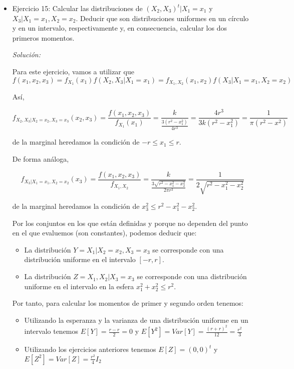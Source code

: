 \documentclass{article}
\theoremstyle{theorem-style}  %
\theoremstyle{definition}
\theoremstyle{example-style}
\begin{document}
\begin{itemize}
		\item Ejercicio 15:  Calcular las distribuciones de $(X_2, X_3)^t|X_1=x_1$ y $X_3|X_1=x_1, X_2=x_2$. Deducir que son distribuciones uniformes en un círculo y en un intervalo, respectivamente y, en consecuencia, calcular los dos primeros momentos.
		
		\textit{Solución: }
		
		Para este ejercicio, vamos a utilizar que $f(x_1, x_2, x_3) = f_{X_1}(x_1) f(X_2, X_3 | X_1 = x_1) = f_{X_1 , X_2}(x_1, x_2) f(X_3 | X_1 = x_1, X_2 = x_2) $
		
		Así, 
		
		\[
			f_{X_2, X_3| X_2 = x_2, X_3 = x_3}(x_2, x_3) =  \frac{f(x_1,x_2,x_3)} {f_{X_1} (x_1)} = \frac{k}{ \frac{3 (r^2 - x_1^2)}{4 r^3} } = \frac{4 r^3}{3 k (r^2 - x_1^2)} = \frac{1}{\pi (r^2 - x^2)} 
		\]
		
		de la marginal heredamos la condición de $-r \leq x_1 \leq r$.
		
		De forma análoga,
		
		\[
			f_{ X_3| X_1 = x_1, X_2 = x_2}(x_3) = \frac{f(x_1, x_2, x_3)}{f_{X_1, X_2}}  = \frac{k}{\frac{3 \sqrt{r^2 - x_1^2 - x_2^2}}{2 \pi r^3}} = \frac{1}{ 2 \sqrt{r^2 - x_1^2 - x_2^2}}
		\] 
		
		de la marginal heredamos la condición de $x_3 ^ 2 \leq r^2 - x_1^2 - x_2^2$.
		
		Por los conjuntos en los que están definidas y porque no dependen del punto en el que evaluemos (son constantes), podemos deducir que:
		
		\begin{itemize}
			\item La distribución $Y = X_1|X_2 = x_2, X_3 = x_3$ se corresponde con una distribución uniforme en el intervalo $[-r,r]$.
			
			\item La distribución $Z =X_1, X_2|X_3 = x_3$ se corresponde con una distribución uniforme en el intervalo  en la esfera $x_1^2 + x_2^2 \leq r^2$.
		\end{itemize}
	
		Por tanto, para calcular los momentos de primer y segundo orden tenemos:
		\begin{itemize}
			\item Utilizando la esperanza y la varianza de una distribución uniforme en un intervalo tenemos $E[Y] = \frac{r -r}{2} = 0$ y $E[Y^2] = Var[Y] = \frac{(r+r)^2}{12} = \frac{r^2}{3}$
			\item Utilizando los ejercicios anteriores tenemos $E[Z] = (0,0)^t$ y $E[Z^2] = Var[Z] = \frac{r^2}{4}I_2$ 
		\end{itemize}
		
	\end{itemize}
	
\end{document}
